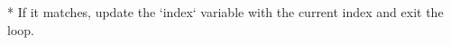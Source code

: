 \documentclass[preview]{standalone}
\begin{document}
* If it matches, update the `index` variable with the current index and exit the loop.\\
\end{document}
